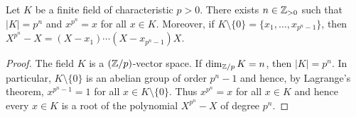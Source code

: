 






\begin{lemma}
	\label{lem:k_finito}
	Let $K$ be a finite field of characteristic $p>0$. There exists 
	$n\in\mathbb{Z}_{>0}$ such that $|K|=p^n$ and $x^{p^n}=x$ for all $x\in K$. Moreover, 
	if $K\setminus\{0\}=\{x_1,\dots,x_{p^n-1}\}$, then 
	$X^{p^n}-X=(X-x_1)\cdots(X-x_{p^n-1})X$. 
\end{lemma}

\begin{proof}
	The field $K$ is a $(\mathbb{Z}/p)$-vector space. If $\dim_{\mathbb{Z}/p} K=n$, then 
	$|K|=p^n$. In particular, $K\setminus\{0\}$ is an abelian
	group of order $p^{n}-1$ and hence, by Lagrange's theorem, 
	$x^{p^n-1}=1$ for all $x\in K\setminus\{0\}$. Thus $x^{p^n}=x$ for all $x\in K$
	and hence every $x\in K$ is a root of the polynomial 
	$X^{p^n}-X$ of degree $p^n$. 
\end{proof}

